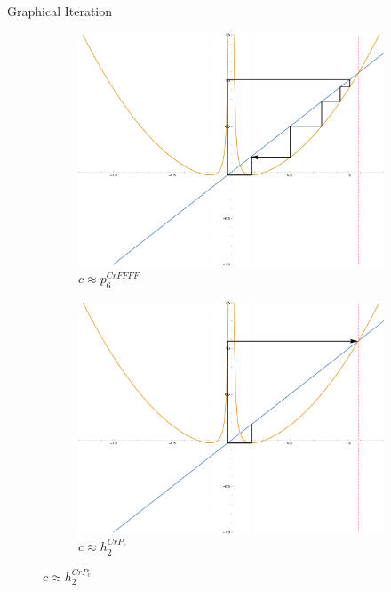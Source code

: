 \documentclass{beamer}
\newcommand{\<}{\left\langle}
\renewcommand{\>}{\right\rangle} %
\renewcommand{\*}{\cdot} %
\begin{document}
\begin{frame}[allowframebreaks]{Graphical Iteration}
\begin{figure}[ht]
		\begin{subfigure}[b]{.49\textwidth}
				\includegraphics[width=\textwidth]{./img/plot-009335}
				\caption{$c \approx p_6^{CrFFFF}$}
		\end{subfigure}
		\begin{subfigure}[b]{.49\textwidth}
				\includegraphics[width=\textwidth]{./img/plot-009245}
				\caption{$c \approx h_2^{CrP_c}$}
		\end{subfigure}

\end{figure}
\end{frame}
\end{document}
